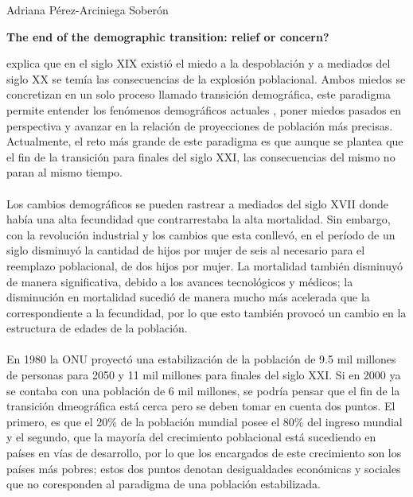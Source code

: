 \documentclass[10pt,spanish,letterpaper]{article}
\theoremstyle{plain}
\begin{document}
\begin{flushleft}
Adriana P\'erez-Arciniega Sober\'on
\end{flushleft}
\begin{center}
\textbf{The end of the demographic transition: relief or concern?}
\end{center}
\cite{vallin2002end} explica que en el siglo XIX existi\'o el miedo a la despoblaci\'on y a mediados del siglo XX se tem\'ia las consecuencias de la explosi\'on poblacional. Ambos miedos se concretizan en un solo proceso llamado transici\'on demogr\'afica, este paradigma permite entender los fen\'omenos demogr\'aficos actuales , poner miedos pasados en perspectiva y avanzar en la relaci\'on de proyecciones de poblaci\'on m\'as precisas. Actualmente, el reto m\'as grande de este paradigma es que aunque se plantea que el fin de la transici\'on para finales del siglo XXI, las consecuencias del mismo no paran al mismo tiempo.\\
\\
Los cambios demogr\'aficos se pueden rastrear a mediados del siglo XVII donde hab\'ia una alta fecundidad que contrarrestaba la alta mortalidad. Sin embargo, con la revoluci\'on industrial y los cambios que esta conllev\'o, en el per\'iodo de un siglo disminuy\'o la cantidad de hijos por mujer de seis al necesario para el reemplazo poblacional, de dos hijos por mujer. La mortalidad tambi\'en disminuy\'o de manera significativa, debido a los avances tecnol\'ogicos y m\'edicos; la disminuci\'on en mortalidad sucedi\'o de manera mucho m\'as acelerada que la correspondiente a la fecundidad, por lo que esto tambi\'en provoc\'o un cambio en la estructura de edades de la poblaci\'on.\\
\\
En 1980 la ONU proyect\'o una estabilizaci\'on de la poblaci\'on de 9.5 mil millones de personas para 2050 y 11 mil millones para finales del siglo XXI. Si en 2000 ya se contaba con una poblaci\'on de 6 mil millones, se podr\'ia pensar que el fin de la transici\'on dmeogr\'afica est\'a cerca pero se deben tomar en cuenta dos puntos. El primero, es que el 20\% de la poblaci\'on mundial posee el 80\% del ingreso mundial y el segundo, que la mayor\'ia del crecimiento poblacional est\'a sucediendo en pa\'ises en v\'ias de desarrollo, por lo que los encargados de este crecimiento son los pa\'ises m\'as pobres; estos dos puntos denotan desigualdades econ\'omicas y sociales que no coresponden al paradigma de una poblaci\'on estabilizada.\\
\\
\end{document}
